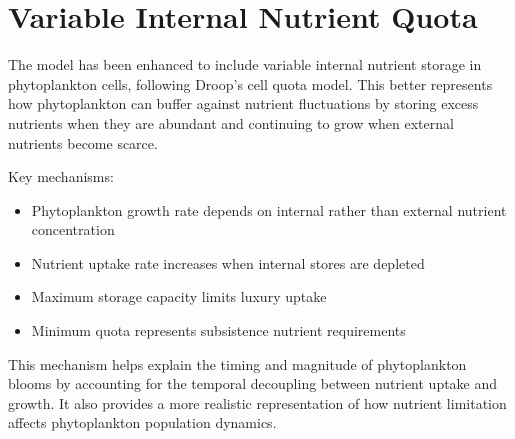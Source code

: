 \section{Variable Internal Nutrient Quota}

The model has been enhanced to include variable internal nutrient storage in phytoplankton cells, following Droop's cell quota model. This better represents how phytoplankton can buffer against nutrient fluctuations by storing excess nutrients when they are abundant and continuing to grow when external nutrients become scarce.

Key mechanisms:
\begin{itemize}
    \item Phytoplankton growth rate depends on internal rather than external nutrient concentration
    \item Nutrient uptake rate increases when internal stores are depleted
    \item Maximum storage capacity limits luxury uptake
    \item Minimum quota represents subsistence nutrient requirements
\end{itemize}

This mechanism helps explain the timing and magnitude of phytoplankton blooms by accounting for the temporal decoupling between nutrient uptake and growth. It also provides a more realistic representation of how nutrient limitation affects phytoplankton population dynamics.

